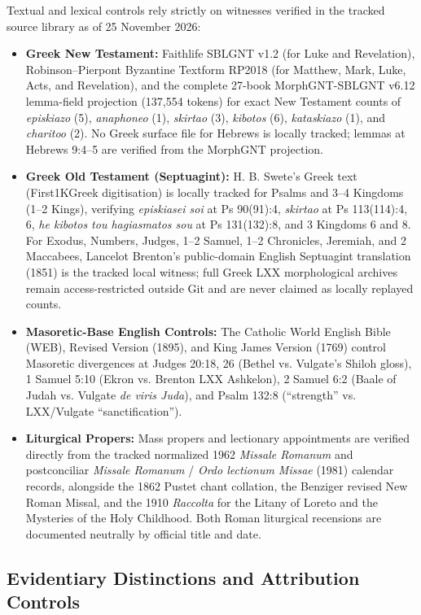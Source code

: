 Textual and lexical controls rely strictly on witnesses verified in the tracked source library as of 25 November 2026:
\begin{itemize}
  \item \textbf{Greek New Testament:} Faithlife SBLGNT v1.2 (for Luke and Revelation), Robinson--Pierpont Byzantine Textform RP2018 (for Matthew, Mark, Luke, Acts, and Revelation), and the complete 27-book MorphGNT-SBLGNT v6.12 lemma-field projection (137,554 tokens) for exact New Testament counts of \textit{episkiazo} (5), \textit{anaphoneo} (1), \textit{skirtao} (3), \textit{kibotos} (6), \textit{kataskiazo} (1), and \textit{charitoo} (2). No Greek surface file for Hebrews is locally tracked; lemmas at Hebrews 9:4--5 are verified from the MorphGNT projection.
  \item \textbf{Greek Old Testament (Septuagint):} H. B. Swete's Greek text (First1KGreek digitisation) is locally tracked for Psalms and 3--4 Kingdoms (1--2 Kings), verifying \textit{episkiasei soi} at Ps 90(91):4, \textit{skirtao} at Ps 113(114):4, 6, \textit{he kibotos tou hagiasmatos sou} at Ps 131(132):8, and 3 Kingdoms 6 and 8. For Exodus, Numbers, Judges, 1--2 Samuel, 1--2 Chronicles, Jeremiah, and 2 Maccabees, Lancelot Brenton's public-domain English Septuagint translation (1851) is the tracked local witness; full Greek LXX morphological archives remain access-restricted outside Git and are never claimed as locally replayed counts.
  \item \textbf{Masoretic-Base English Controls:} The Catholic World English Bible (WEB), Revised Version (1895), and King James Version (1769) control Masoretic divergences at Judges 20:18, 26 (Bethel vs. Vulgate's Shiloh gloss), 1 Samuel 5:10 (Ekron vs. Brenton LXX Ashkelon), 2 Samuel 6:2 (Baale of Judah vs. Vulgate \textit{de viris Juda}), and Psalm 132:8 (``strength'' vs. LXX/Vulgate ``sanctification'').
  \item \textbf{Liturgical Propers:} Mass propers and lectionary appointments are verified directly from the tracked normalized 1962 \textit{Missale Romanum} and postconciliar \textit{Missale Romanum} / \textit{Ordo lectionum Missae} (1981) calendar records, alongside the 1862 Pustet chant collation, the Benziger revised New Roman Missal, and the 1910 \textit{Raccolta} for the Litany of Loreto and the Mysteries of the Holy Childhood. Both Roman liturgical recensions are documented neutrally by official title and date.
\end{itemize}

\subsection{Evidentiary Distinctions and Attribution Controls}


